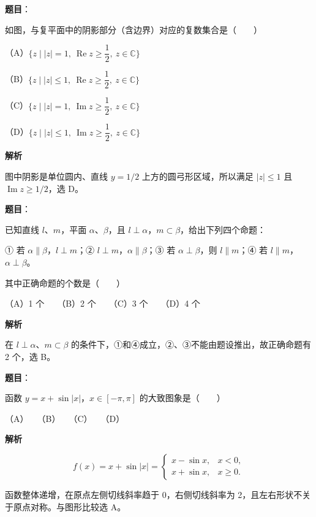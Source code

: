 \begin{answer}

\textbf{题目}：

如图，与复平面中的阴影部分（含边界）对应的复数集合是\mbox{（　　）}
\nopagebreak[4]
\begin{center}\end{center}
\nopagebreak[4]
（A）$\{z\mid |z|=1,\ \operatorname{Re}z\ge\dfrac12,\ z\in\mathbb C\}$

（B）$\{z\mid |z|\le1,\ \operatorname{Re}z\ge\dfrac12,\ z\in\mathbb C\}$

（C）$\{z\mid |z|=1,\ \operatorname{Im}z\ge\dfrac12,\ z\in\mathbb C\}$

（D）$\{z\mid |z|\le1,\ \operatorname{Im}z\ge\dfrac12,\ z\in\mathbb C\}$

\textbf{解析}

图中阴影是单位圆内、直线 $y=1/2$ 上方的圆弓形区域，所以满足 $|z|\le1$ 且 $\operatorname{Im}z\ge1/2$，选 D。


\end{answer}
\begin{answer}

\textbf{题目}：

已知直线 $l\text{、}m$，平面 $\alpha\text{、}\beta$，且 $l\perp\alpha$，$m\subset\beta$，给出下列四个命题：

① 若 $\alpha\parallel\beta$，$l\perp m$；② $l\perp m$，$\alpha\parallel\beta$；③ 若 $\alpha\perp\beta$，则 $l\parallel m$；④ 若 $l\parallel m$，$\alpha\perp\beta$。

其中正确命题的个数是\mbox{（　　）}

（A）1 个　　（B）2 个　　（C）3 个　　（D）4 个

\textbf{解析}

在 $l\perp\alpha$、$m\subset\beta$ 的条件下，①和④成立，②、③不能由题设推出，故正确命题有 2 个，选 B。


\end{answer}
\begin{answer}

\textbf{题目}：

函数 $y=x+\sin|x|$，$x\in[-\pi,\pi]$ 的大致图象是\mbox{（　　）}
\nopagebreak[4]
\begin{center}\end{center}
\nopagebreak[4]
（A）　　（B）　　（C）　　（D）

\textbf{解析}

\nopagebreak[4]
\[
f(x)=x+\sin|x|=
\begin{cases}
x-\sin x,&x<0,\\
x+\sin x,&x\ge0.
\end{cases}
\]

函数整体递增，在原点左侧切线斜率趋于 0，右侧切线斜率为 2，且左右形状不关于原点对称。与图形比较选 A。


\end{answer}
